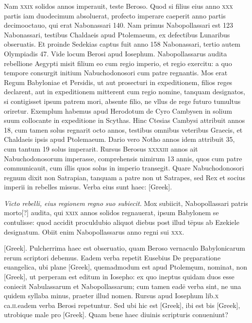 \begin{parnumbers}
{}
Nam \textsc{xxix} solidos annos imperauit,
teste Beroso.
\lnr{}Quod si filius eius anno \textsc{xxx} partis iam duodecimum
absoluerat, profecto imperare caeperit anno partis decimooctauo,
qui erat Nabonassari 140.
\lnr{}Nam primus Nabopollassari est 123 Nabonassari,
testibus Chaldaeis apud Ptolemaeum, ex defectibus Lunaribus
obseruatis.
\lnr{}Et proinde Sedekias captus fuit anno 158 Nabonassari,
tertio autem Olympiadis 47.
\lnr{}Vide locum Berosi apud Iosephum.
\lnr{}Nabopollassarus audita rebellione Aegypti misit filium eo
cum regio imperio, et regio exercitu: a quo tempore consurgit initium
Nabuchodonosori cum patre regnantis.
\lnr{}Mos erat Regum Babyloniae
et Persidis, ut aut prosecturi in expeditionem, filios reges declarent,
aut in expeditionem mitterent cum regio nomine, tanquam
designatos, si contigisset ipsum patrem mori, absente filio, ne
vllus de rege futuro tumultus oriretur.
\lnr{}Exemplum habemus apud
Herodotum de Cyro Cambysen in solium suum collocante in expeditione
in Scythas.
\lnr{}Hinc Ctesias Cambysi attribuit annos 18,
cum tamen solus regnarit octo annos, testibus omnibus veteribus
Graecis, et Chaldaeis ipsis apud Ptolemaeum.
\lnr{}Dario vero Notho annos
idem attribuit 35, cum tantum 19 solus imperarit.
\lnr{}Rursus Berosus
\textsc{xxxxiii} annos ait Nabuchodonosorum imperasse, comprehensis
nimirum 13 annis, quos cum patre communicauit, cum
illis quos solus in imperio transegit.
\lnr{}Quare Nabuchodonosori regnum
dixit non Satrapian, tanquam a patre non ut Satrapes, sed Rex
et socius imperii in rebelles missus.
\lnr{}Verba eius sunt haec: \textgreek{[Greek]}.

\textit{Victo rebelli, eius regionem regno suo subiecit.}
\lnr{}Mox subiicit, Nabopollassari patris morto[?]
audita, qui \textsc{xxix} annos solidos regnauerat, ipsum Babylonem se
contulisse: quod accidit proculdubio aliquot diebus post illud tēpus
ab Ezekiele designatum.
\lnr{}Obiit enim Nabopollassarus anno regni
sui \textsc{xxx}.

\textgreek{[Greek]}.
\lnr{}Pulcherrima haec est obseruatio, quam Beroso vernaculo
Babylonicarum rerum scriptori debemus.
\lnr{}Eadem verba repetit Eusebius
De pręparatione euangelica, ubi plane \textgreek{[Greek]}, quemadmodum
est apud Ptolemęum, nominat, non \textgreek{[Greek]}, ut perperam
est editum in Iosepho: ex quo ineptus quidam duos esse coniecit
Nabulassarum et Nabopollassarum; cum tamen eadē verba sint, ne
una quidem syllaba minus, praeter illud nomen.
\lnr{}Rursus apud Iosephum
lib.\textsc{x} ca.\textsc{ii}.eadem verba Berosi repetuntur.
\lnr{}Sed ubi hic est \textgreek{[Greek]},
ibi est bis \textgreek{[Greek]}, utrobique male pro \textgreek{[Greek]}.
\lnr{}Quam bene haec diuinis scripturis conueniunt?


\end{parnumbers}
